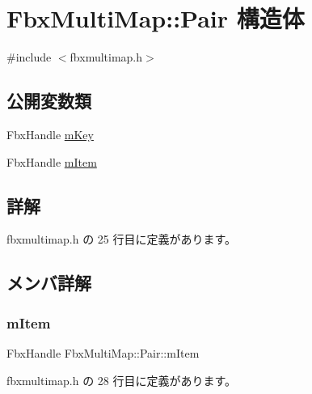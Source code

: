 \hypertarget{struct_fbx_multi_map_1_1_pair}{}\section{Fbx\+Multi\+Map\+:\+:Pair 構造体}
\label{struct_fbx_multi_map_1_1_pair}


{\ttfamily \#include $<$fbxmultimap.\+h$>$}

\subsection*{公開変数類}
\begin{DoxyCompactItemize}
\item 
Fbx\+Handle \hyperlink{struct_fbx_multi_map_1_1_pair_a1f27833009f19a3416efb50bc74c9e3e}{m\+Key}
\item 
Fbx\+Handle \hyperlink{struct_fbx_multi_map_1_1_pair_a7754a75906a6dbf593cfe25f235e28b4}{m\+Item}
\end{DoxyCompactItemize}


\subsection{詳解}


 fbxmultimap.\+h の 25 行目に定義があります。



\subsection{メンバ詳解}
\mbox{\label{struct_fbx_multi_map_1_1_pair_a7754a75906a6dbf593cfe25f235e28b4}} 
\subsubsection{\texorpdfstring{m\+Item}{mItem}}
{\footnotesize\ttfamily Fbx\+Handle Fbx\+Multi\+Map\+::\+Pair\+::m\+Item}



 fbxmultimap.\+h の 28 行目に定義があります。

\mbox{\label{struct_fbx_multi_map_1_1_pair_a1f27833009f19a3416efb50bc74c9e3e}} 
